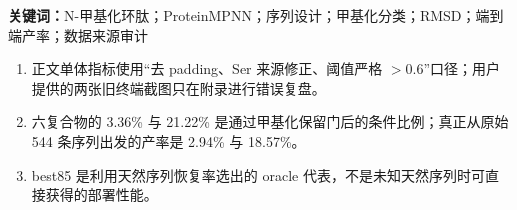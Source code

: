 \noindent\textbf{关键词：}N-甲基化环肽；ProteinMPNN；序列设计；甲基化分类；RMSD；端到端产率；数据来源审计

\begin{tcolorbox}[colback=SoftAmber,colframe=Amber,title=读者先看这三句话]
  \begin{enumerate}
    \item 正文单体指标使用“去 padding、Ser 来源修正、阈值严格 $>0.6$”口径；用户提供的两张旧终端截图只在附录进行错误复盘。
    \item 六复合物的 3.36\% 与 21.22\% 是通过甲基化保留门后的条件比例；真正从原始 544 条序列出发的产率是 2.94\% 与 18.57\%。
    \item best85 是利用天然序列恢复率选出的 oracle 代表，不是未知天然序列时可直接获得的部署性能。
  \end{enumerate}
\end{tcolorbox}
